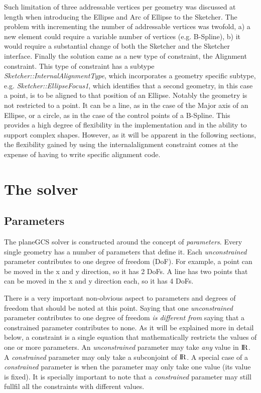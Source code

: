 \documentclass[12pt,twoside,a4paper]{book}
\newenvironment{tolerant}[1]{%
  \par\tolerance=#1\relax
}{%
  \par
}
\begin{document}
\begin{tolerant}{500}
    Such limitation of three addressable vertices per geometry was discussed at length when introducing the Ellipse and Arc of Ellipse to the Sketcher. The problem with incrementing the number of addressable vertices was twofold, a) a new element could require a variable number of vertices (e.g. B-Spline), b) it would require a substantial change of both the Sketcher and the Sketcher interface. Finally the solution came as a new type of constraint, the Alignment constraint. This type of constraint has a subtype \emph{Sketcher::InternalAlignmentType}, which incorporates a geometry specific subtype, e.g. \emph{Sketcher::EllipseFocus1}, which identifies that a second geometry, in this case a point, is to be aligned to that position of an Ellipse. Notably the geometry is not restricted to a point. It can be a line, as in the case of the Major axis of an Ellipse, or a circle, as in the case of the control points of a B-Spline. This provides a high degree of flexibility in the implementation and in the ability to support complex shapes. However, as it will be apparent in the following sections, the flexibility gained by using the internalalignment constraint comes at the expense of having to write specific alignment code.
    \end{tolerant}

    \section{The solver}

    \subsection{Parameters}
    \label{sec:architecture:solver:parameters}

    The planeGCS solver is constructed around the concept of \emph{parameters}. Every single geometry has a number of parameters that define it. Each \emph{unconstrained} parameter contributes to one degree of freedom (DoF). For example, a point can be moved in the x and y direction, so it has 2 DoFs. A line has two points that can be moved in the x and y direction each, so it has 4 DoFs.

    There is a very important non-obvious aspect to parameters and degrees of freedom that should be noted at this point. Saying that one \emph{unconstrained} parameter contributes to one degree of freedom \emph{is different from} saying that a constrained parameter contributes to none. As it will be explained more in detail below, a constraint is a single equation that mathematically restricts the values of one or more parameters. An \emph{unconstrained} parameter may take \emph{any} value in ${\rm I\!R}$. A \emph{constrained} parameter may only take a subconjoint of ${\rm I\!R}$. A special case of a \emph{constrained} parameter is when the parameter may only take one value (its value is fixed). It is specially important to note that a \emph{constrained} parameter may still fullfil all the constraints with different values.
\end{document}

